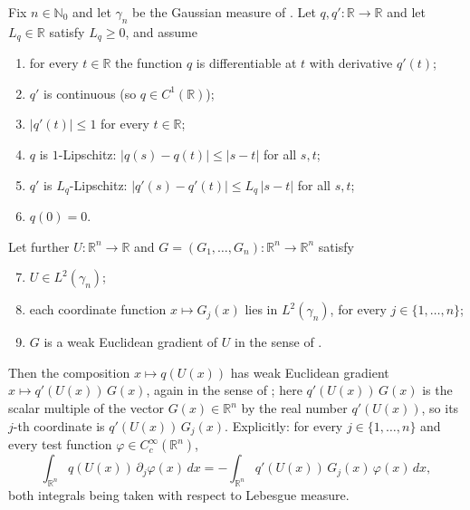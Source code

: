 \begin{lemma}
Fix $n \in \mathbb{N}_0$ and let $\gamma_n$ be the Gaussian measure of
.  Let $q, q' : \mathbb{R} \to \mathbb{R}$ and let
$L_q \in \mathbb{R}$ satisfy $L_q \geq 0$, and assume
\begin{enumerate}
  \item for every $t \in \mathbb{R}$ the function $q$ is differentiable at $t$
    with derivative $q'(t)$;
  \item $q'$ is continuous (so $q \in C^1(\mathbb{R})$);
  \item $|q'(t)| \leq 1$ for every $t \in \mathbb{R}$;
  \item $q$ is $1$-Lipschitz: $|q(s) - q(t)| \leq |s - t|$ for all $s,t$;
  \item $q'$ is $L_q$-Lipschitz: $|q'(s) - q'(t)| \leq L_q\,|s - t|$ for all $s,t$;
  \item $q(0) = 0$.
\end{enumerate}
Let further $U : \mathbb{R}^n \to \mathbb{R}$ and
$G = (G_1,\ldots,G_n) : \mathbb{R}^n \to \mathbb{R}^n$ satisfy
\begin{enumerate}
  \setcounter{enumi}{6}
  \item $U \in L^2(\gamma_n)$;
  \item each coordinate function $x \mapsto G_j(x)$ lies in $L^2(\gamma_n)$,
    for every $j \in \{1,\ldots,n\}$;
  \item $G$ is a weak Euclidean gradient of $U$ in the sense of
    .
\end{enumerate}
Then the composition $x \mapsto q(U(x))$ has weak Euclidean gradient
$x \mapsto q'(U(x))\,G(x)$, again in the sense of ;
here $q'(U(x))\,G(x)$ is the scalar multiple of the vector $G(x) \in \mathbb{R}^n$
by the real number $q'(U(x))$, so its $j$-th coordinate is
$q'(U(x))\,G_j(x)$.  Explicitly: for every $j \in \{1,\ldots,n\}$ and every test
function $\varphi \in C_c^\infty(\mathbb{R}^n)$,
\[
  \int_{\mathbb{R}^n} q(U(x))\, \partial_j \varphi(x)\, dx
    = -\int_{\mathbb{R}^n} q'(U(x))\,G_j(x)\, \varphi(x)\, dx ,
\]
both integrals being taken with respect to Lebesgue measure.
\end{lemma}
